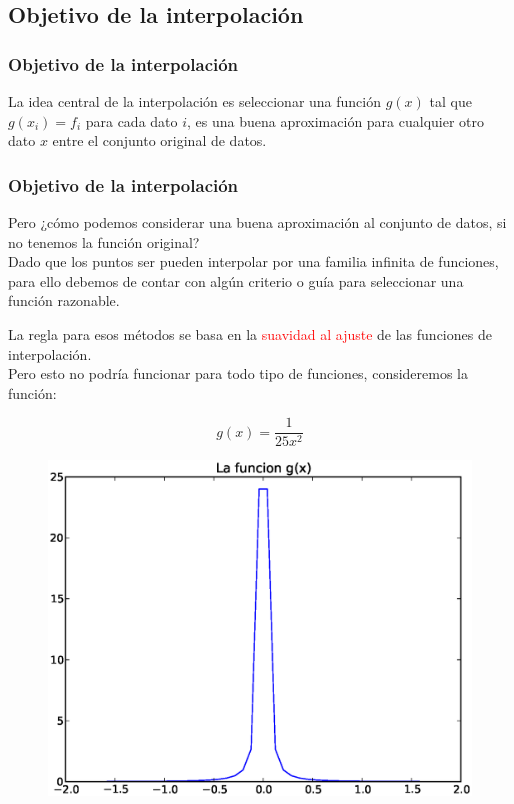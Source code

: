 \subsection{Objetivo de la interpolación}
\begin{frame}
\frametitle{Objetivo de la interpolación}
La idea central de la interpolación es seleccionar una función $g(x)$ tal que $g(x_{i}) = f_{i}$ para cada dato $i$, es una buena aproximación para cualquier otro dato $x$ entre el conjunto original de datos.
\end{frame}
\begin{frame}
\frametitle{Objetivo de la interpolación}
Pero ¿cómo podemos considerar una buena aproximación al conjunto de datos, si no tenemos la función original?
\\
\bigskip
Dado que los puntos ser pueden interpolar por una familia infinita de funciones, para ello debemos de contar con algún criterio o guía para seleccionar una función razonable.
\end{frame}
\begin{frame}
La regla para esos métodos se basa en la \textcolor{red}{suavidad al ajuste} de las funciones de interpolación.
\\
\bigskip
\pause
Pero esto no podría funcionar para todo tipo de funciones, consideremos la función:
\\
\medskip
\begin{minipage}{3cm}
\[g(x) = \dfrac{1}{25 x^{2}}\]
\end{minipage}
\hspace{0.5cm}
\begin{minipage}{6cm}
\begin{figure}
	\centering
	 \includegraphics[scale=0.3]{Imagenes/grafica02.eps}  
\end{figure}
\end{minipage}
\end{frame}
